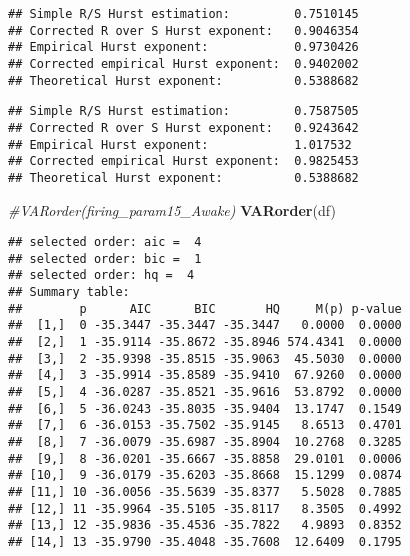 \documentclass[
]{article}
\newenvironment{Shaded}{\begin{snugshade}}{\end{snugshade}}
\newcommand{\CommentTok}[1]{\textcolor[rgb]{0.56,0.35,0.01}{\textit{#1}}}
\newcommand{\FunctionTok}[1]{\textcolor[rgb]{0.13,0.29,0.53}{\textbf{#1}}}
\newcommand{\NormalTok}[1]{#1}
\newcommand{\SpecialCharTok}[1]{\textcolor[rgb]{0.81,0.36,0.00}{\textbf{#1}}}
\begin{document}
\begin{Shaded}
\end{Shaded}

\begin{verbatim}
## Simple R/S Hurst estimation:         0.7510145 
## Corrected R over S Hurst exponent:   0.9046354 
## Empirical Hurst exponent:            0.9730426 
## Corrected empirical Hurst exponent:  0.9402002 
## Theoretical Hurst exponent:          0.5388682
\end{verbatim}

\begin{Shaded}
\end{Shaded}

\begin{Shaded}
\end{Shaded}

\begin{verbatim}
## Simple R/S Hurst estimation:         0.7587505 
## Corrected R over S Hurst exponent:   0.9243642 
## Empirical Hurst exponent:            1.017532 
## Corrected empirical Hurst exponent:  0.9825453 
## Theoretical Hurst exponent:          0.5388682
\end{verbatim}

\begin{Shaded}
\begin{Highlighting}[]
\CommentTok{\#VARorder(firing\_param15\_Awake)}
\FunctionTok{VARorder}\NormalTok{(df)}
\end{Highlighting}
\end{Shaded}

\begin{verbatim}
## selected order: aic =  4 
## selected order: bic =  1 
## selected order: hq =  4 
## Summary table:  
##        p      AIC      BIC       HQ     M(p) p-value
##  [1,]  0 -35.3447 -35.3447 -35.3447   0.0000  0.0000
##  [2,]  1 -35.9114 -35.8672 -35.8946 574.4341  0.0000
##  [3,]  2 -35.9398 -35.8515 -35.9063  45.5030  0.0000
##  [4,]  3 -35.9914 -35.8589 -35.9410  67.9260  0.0000
##  [5,]  4 -36.0287 -35.8521 -35.9616  53.8792  0.0000
##  [6,]  5 -36.0243 -35.8035 -35.9404  13.1747  0.1549
##  [7,]  6 -36.0153 -35.7502 -35.9145   8.6513  0.4701
##  [8,]  7 -36.0079 -35.6987 -35.8904  10.2768  0.3285
##  [9,]  8 -36.0201 -35.6667 -35.8858  29.0101  0.0006
## [10,]  9 -36.0179 -35.6203 -35.8668  15.1299  0.0874
## [11,] 10 -36.0056 -35.5639 -35.8377   5.5028  0.7885
## [12,] 11 -35.9964 -35.5105 -35.8117   8.3505  0.4992
## [13,] 12 -35.9836 -35.4536 -35.7822   4.9893  0.8352
## [14,] 13 -35.9790 -35.4048 -35.7608  12.6409  0.1795
\end{verbatim}
\end{document}
